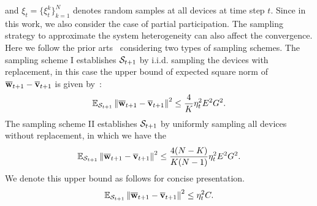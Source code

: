 and $\xi_t = \{\xi_t^k\}_{k=1}^N$ denotes random samples at all devices at time step $t$. 
Since in this work, we also consider the case of partial participation. The sampling
strategy to approximate the system heterogeneity can also affect the convergence. Here we
follow the prior arts~\cite{haddadpour2019convergence} considering two types of sampling
schemes. 
The sampling scheme I establishes ${\mathcal{S}}_{t+1}$ by i.i.d. sampling the devices with replacement,
in this case the upper bound of expected square norm of ${\overline{\mathbf{w}}}_{t+1} - {\overline{\mathbf{v}}}_{t+1}$ is given by~\cite[Lemma 5]{li2019convergence}:
\begin{align}
\mathbb{E}_{{\mathcal{S}}_{t+1}}\left\|{\overline{\mathbf{w}}}_{t+1} - {\overline{\mathbf{v}}}_{t+1}\right\|^2	\leq \frac{4}{K} \eta_t^2 E^2G^2.
\end{align}
The sampling scheme II establishes ${\mathcal{S}}_{t+1}$ by uniformly sampling all devices without
replacement, in which we have the 
\begin{align}
\mathbb{E}_{{\mathcal{S}}_{t+1}}\left\|{\overline{\mathbf{w}}}_{t+1} - {\overline{\mathbf{v}}}_{t+1}\right\|^2	\leq \frac{4(N - K)}{K(N-1)} \eta_t^2 E^2G^2.
\end{align}
We denote this upper bound as follows for concise presentation. 
\begin{align}
	\mathbb{E}_{{\mathcal{S}}_{t+1}}\left\|{\overline{\mathbf{w}}}_{t+1} - {\overline{\mathbf{v}}}_{t+1}\right\|^2 \leq  \eta_t^2 C.
	\label{eq:partialsample}
\end{align}